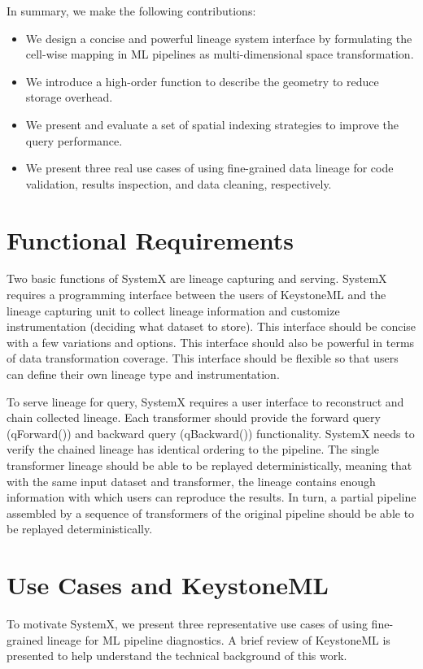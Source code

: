 \documentclass{sig-alternate}
\newenvironment{shortlist}{
        \vspace*{-0.5em}
  \begin{itemize}
  \setlength{\itemsep}{-0.1em}
}{
  \end{itemize}
        \vspace*{-0.5em}
}
\begin{document}
In summary, we make the following contributions:
\begin{shortlist}
\item{} We design a concise and powerful lineage system interface by formulating the cell-wise mapping in ML pipelines as multi-dimensional space transformation.
\item{} We introduce a high-order function to describe the geometry to reduce storage overhead.
\item{} We present and evaluate a set of spatial indexing strategies to improve the query performance.
\item{} We present three real use cases of using fine-grained data lineage for code validation, results inspection, and data cleaning, respectively.
\end{shortlist}

\section{Functional Requirements}
\label{sec:functional}
Two basic functions of SystemX are lineage capturing and serving.
SystemX requires a programming interface between the users of KeystoneML and the lineage capturing unit to 
collect lineage information and customize instrumentation (deciding what dataset to store). 
This interface should be concise with a few variations and options.
This interface should also be powerful in terms of data transformation coverage.
This interface should be flexible so that users can define their own lineage type and instrumentation.

To serve lineage for query, SystemX requires a user interface to reconstruct and chain collected lineage.
Each transformer should provide the forward query (qForward()) and backward query (qBackward()) functionality.
SystemX needs to verify the chained lineage has identical ordering to the pipeline.
The single transformer lineage should be able to be replayed deterministically, meaning that with the same input dataset and transformer,
the lineage contains enough information with which users can reproduce the results.
In turn, a partial pipeline assembled by a sequence of transformers of the original pipeline should be able to be replayed deterministically.

\section{Use Cases and K\MakeLowercase{eystone}ML}
\label{sec:Background}
To motivate SystemX, we present three representative use cases of using fine-grained lineage for ML pipeline diagnostics.
A brief review of KeystoneML is presented to help understand the technical background of this work.
\end{document}
